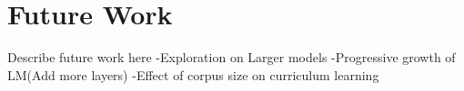 \chapter{Future Work}
Describe future work here
-Exploration on Larger models
-Progressive growth of LM(Add more layers)
-Effect of corpus size on curriculum learning